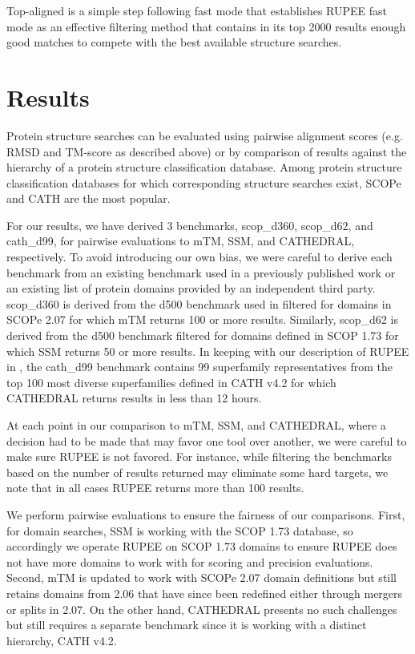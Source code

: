\documentclass[10pt,letterpaper]{article}
\begin{document}
Top-aligned is a simple step following fast mode that establishes RUPEE fast mode as an effective filtering method that contains in its top 2000 results enough good matches to compete with the best available structure searches.

\section*{Results}

Protein structure searches can be evaluated using pairwise alignment scores (e.g. RMSD and TM-score as described above) or by comparison of results against the hierarchy of a protein structure classification database.
Among protein structure classification databases for which corresponding structure searches exist, SCOPe \cite{Fox2013} and CATH \cite{Orengo1997} are the most popular. 

For our results, we have derived 3 benchmarks, scop\_d360, scop\_d62, and cath\_d99, for pairwise evaluations to mTM, SSM, and CATHEDRAL, respectively.
To avoid introducing our own bias, we were careful to derive each benchmark from an existing benchmark used in a previously published work or an existing list of protein domains provided by an independent third party.  
scop\_d360 is derived from the d500 benchmark used in \cite{Dong2018} filtered for domains in SCOPe 2.07 for which mTM returns 100 or more results.
Similarly, scop\_d62 is derived from the d500 benchmark filtered for domains defined in SCOP 1.73 for which SSM returns 50 or more results.  
In keeping with our description of RUPEE in \cite{Ayoub2017}, the cath\_d99 benchmark contains 99 superfamily representatives from the top 100 most diverse superfamilies defined in CATH v4.2 for which CATHEDRAL returns results in less than 12 hours.

At each point in our comparison to mTM, SSM, and CATHEDRAL, where a decision had to be made that may favor one tool over another, we were careful to make sure RUPEE is not favored. 
For instance, while filtering the benchmarks based on the number of results returned may eliminate some hard targets, we note that in all cases RUPEE returns more than 100 results. 

We perform pairwise evaluations to ensure the fairness of our comparisons. 
First, for domain searches, SSM is working with the SCOP 1.73 database, so accordingly we operate RUPEE on SCOP 1.73 domains to ensure RUPEE does not have more domains to work with for scoring and precision evaluations. 
Second, mTM is updated to work with SCOPe 2.07 domain definitions but still retains domains from 2.06 that have since been redefined either through mergers or splits in 2.07. 
On the other hand, CATHEDRAL presents no such challenges but still requires a separate benchmark since it is working with a distinct hierarchy, CATH v4.2. 
\end{document}
